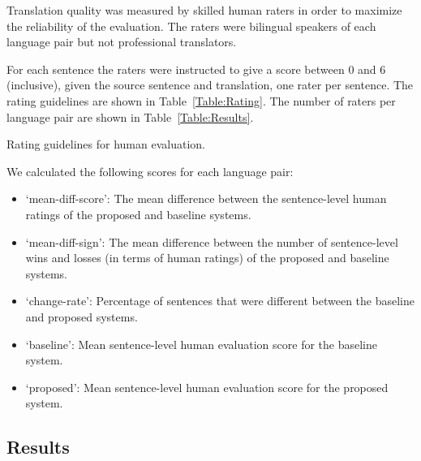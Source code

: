\documentclass[english]{jnlp_1.4}
\begin{document}
Translation quality was measured by skilled human raters in order to maximize
the reliability of the evaluation.
The raters were bilingual speakers of each language pair but not professional
translators.

For each sentence the raters were instructed to give a score between 0 and 6 (inclusive),
given the source sentence and translation, one rater per sentence.
The rating guidelines are shown in Table~\ref{Table:Rating}.
The number of raters per language pair are shown in Table~\ref{Table:Results}.

\begin{table}[b]
\caption{Rating guidelines for human evaluation.}
\label{Table:Rating}

\end{table}

We calculated the following scores for each language pair:
\begin{itemize}
\item `mean-diff-score': The mean difference between the sentence-level
human ratings of the proposed and baseline systems.
\item `mean-diff-sign': The mean difference between the number of sentence-level
wins and losses (in terms of human ratings) of the proposed and baseline systems.
\item `change-rate': Percentage of sentences that were different between the baseline and proposed systems.
\item `baseline': Mean sentence-level human evaluation score for the baseline system.
\item `proposed': Mean sentence-level human evaluation score for the proposed system.
\end{itemize}

\begin{table}[b]
\label{Table:Results}

\end{table}


\subsection{Results}

\begin{table}[b]
\label{Table:Diff}

\end{table}
\end{document}
